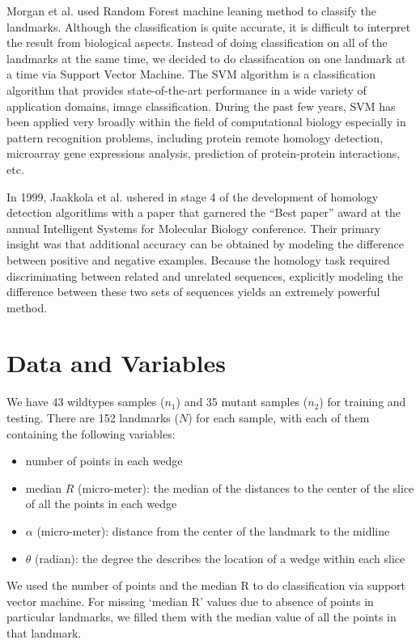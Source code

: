 \documentclass[10pt,letterpaper]{article}
\providecommand{\tightlist}{%
  \setlength{\itemsep}{0pt}\setlength{\parskip}{0pt}}
\begin{document}
Morgan et al. used Random Forest machine leaning method to classify the
landmarks. Although the classification is quite accurate, it is
difficult to interpret the result from biological aspects. Instead of
doing classification on all of the landmarks at the same time, we
decided to do classifacation on one landmark at a time via Support
Vector Machine. The SVM algorithm is a classification algorithm that
provides state-of-the-art performance in a wide variety of application
domains, image classification. During the past few years, SVM has been
applied very broadly within the field of computational biology
especially in pattern recognition problems, including protein remote
homology detection, microarray gene expressions analysis, prediction of
protein-protein interactions, etc.

In 1999, Jaakkola et al. ushered in stage 4 of the development of
homology detection algorithms with a paper that garnered the ``Best
paper'' award at the annual Intelligent Systems for Molecular Biology
conference. Their primary insight was that additional accuracy can be
obtained by modeling the difference between positive and negative
examples. Because the homology task required discriminating between
related and unrelated sequences, explicitly modeling the difference
between these two sets of sequences yields an extremely powerful method.

\section{Data and Variables}\label{data-and-variables}

We have 43 wildtypes samples (\(n_1\)) and 35 mutant samples (\(n_2\))
for training and testing. There are 152 landmarks (\(N\)) for each
sample, with each of them containing the following variables:

\begin{itemize}
\tightlist
\item
  number of points in each wedge
\item
  median \(R\) (micro-meter): the median of the distances to the center
  of the slice of all the points in each wedge
\item
  \(\alpha\) (micro-meter): distance from the center of the landmark to
  the midline
\item
  \(\theta\) (radian): the degree the describes the location of a wedge
  within each slice
\end{itemize}

We used the number of points and the median R to do classification via
support vector machine. For missing `median R' values due to absence of
points in particular landmarks, we filled them with the median value of
all the points in that landmark.
\end{document}
